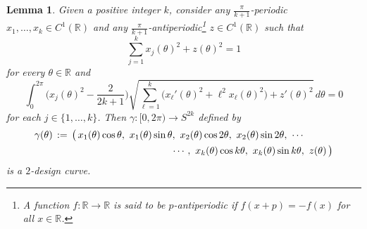 \documentclass[12pt]{article}
\theoremstyle{plain}
\newtheorem{lemma}[thm]{Lemma}
\theoremstyle{definition}
\theoremstyle{remark}
\newcommand{\bR}{\mathbb{R}}
\newcommand{\rar}{\rightarrow}
\begin{document}
\begin{lemma}
\label{lem.ansatz}
Given a positive integer $k$, consider any $\frac{\pi}{k+1}$-periodic $x_1,\ldots,x_k\in C^1(\mathbb{R})$ and any $\frac{\pi}{k+1}$-antiperiodic\footnote{A function $f\colon \bR \rar \bR$ is said to be \emph{$p$-antiperiodic} if $f(x+p)=-f(x)$ for all $x \in \bR$.} $z\in C^1(\mathbb{R})$ such that
\begin{equation}
\label{eq.norm condition}
\sum_{j=1}^kx_j(\theta)^2+z(\theta)^2
=1
\end{equation}
for every $\theta\in\mathbb{R}$ and
\begin{equation}
\label{eq.2 design condition}
\int_0^{2\pi}\bigg(x_j(\theta)^2-\frac{2}{2k+1}\bigg)\sqrt{\sum_{\ell=1}^k \big(x_\ell'(\theta)^2+\ell^2x_\ell(\theta)^2\big)+z'(\theta)^2}\,d\theta
=0
\end{equation}
for each $j\in\{1,\ldots,k\}$.
Then $\gamma\colon[0,2\pi)\to S^{2k}$ defined by
\begin{align*}
\gamma(\theta)
\,&:=\,\big(
\,x_1(\theta)\cos\theta,
~x_1(\theta)\sin\theta,
~x_2(\theta)\cos2\theta,
~x_2(\theta)\sin2\theta,
~\cdots\\
&\hspace{1.6in}
~\cdots,
~x_k(\theta)\cos k\theta,
~x_k(\theta)\sin k\theta,
~z(\theta)
\,\big)
\end{align*}
is a $2$-design curve.
\end{lemma}
\end{document}
